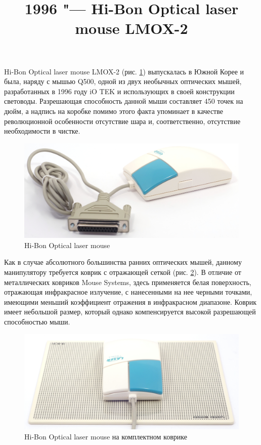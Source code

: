\documentclass[11pt, a4paper]{article}
\begin{document}
\title{1996 "--- Hi-Bon Optical laser mouse LMOX-2}
\date{}
\maketitle
{}
    Hi-Bon Optical laser mouse LMOX-2 (рис. \ref{fig:OpticalLaserMousePic}) выпускалась в Южной Корее и была, наряду с мышью Q500, одной из двух необычных оптических мышей, разработанных в 1996 году iO TEK и использующих в своей конструкции световоды. Разрешающая способность данной мыши составляет 450 точек на дюйм, а надпись на коробке помимо этого факта упоминает в качестве революционной особенности отсутствие шара и, соответственно, отсутствие необходимости в чистке.

\begin{figure}[h]
    \centering
    \includegraphics[scale=0.4]{1996_hi-bon_laser_mouse/pic_30.jpg}
    \caption{Hi-Bon Optical laser mouse}
    \label{fig:OpticalLaserMousePic}
\end{figure}

Как в случае абсолютного большинства ранних оптических мышей, данному манипулятору требуется коврик с отражающей сеткой (рис. \ref{fig:OpticalLaserMousePad}). В отличие от металлических ковриков Mouse Systems, здесь применяется белая поверхность, отражающая инфракрасное излучение, с нанесенными на нее черными точками, имеющими меньший коэффициент отражения в инфракрасном диапазоне. Коврик имеет небольшой размер, который однако компенсируется высокой разрешающей способностью мыши.

\begin{figure}[h]
    \centering
    \includegraphics[scale=0.4]{1996_hi-bon_laser_mouse/pic2_30.jpg}
    \caption{Hi-Bon Optical laser mouse на комплектном коврике}
    \label{fig:OpticalLaserMousePad}
\end{figure}
\end{document}
